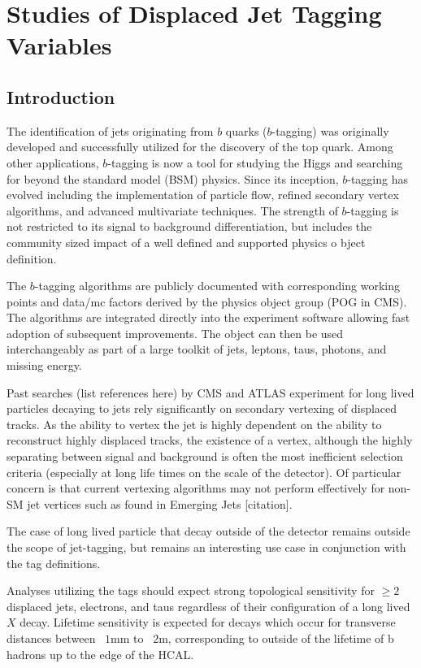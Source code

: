 \chapter{Studies of Displaced Jet Tagging Variables}

\section{Introduction}


The identification of jets originating from $b$ quarks ($b$-tagging) was originally developed and successfully utilized for the discovery of the top quark.
 Among other applications, $b$-tagging is now a tool for studying the Higgs and searching for beyond the standard model (BSM) physics.
 Since its inception, $b$-tagging has evolved including the implementation of particle flow, refined secondary vertex algorithms, and advanced multivariate techniques. 
The strength of $b$-tagging is not restricted to its signal to background differentiation, but includes the community sized impact of a well defined and supported physics o
bject definition. 

The $b$-tagging algorithms are publicly documented with corresponding working points and data/mc factors derived by the physics object group (POG in CMS). 
The algorithms are integrated directly into the experiment software allowing fast adoption of subsequent improvements.  The object can then be
used interchangeably as part of a large toolkit of jets, leptons, taus, photons, and missing energy. 

Past searches (list references here) by CMS and ATLAS experiment for long lived particles decaying to jets rely significantly 
on secondary vertexing of displaced tracks. As the ability to vertex the jet is highly dependent on the ability to reconstruct 
highly displaced tracks, the existence of a vertex, although the  highly separating between signal and background is often the most inefficient selection criteria
 (especially at long life times on the scale of the detector). Of particular concern is that current vertexing algorithms may not 
 perform effectively for non-SM jet vertices such as found in Emerging Jets [citation].

The case of long lived particle that decay outside of the detector remains outside the scope of jet-tagging, but remains an interesting use 
case in conjunction with the tag definitions. 

Analyses utilizing the tags should expect strong topological sensitivity for $\geq 2$ displaced jets, electrons, and taus regardless of their
configuration of a long lived $X$ decay. Lifetime sensitivity is expected for decays which occur for transverse distances between ~$1$mm to ~$2$m,
corresponding to outside of the lifetime of b hadrons up to the edge of the HCAL.


